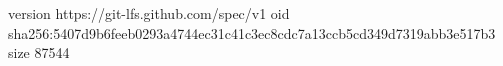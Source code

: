 version https://git-lfs.github.com/spec/v1
oid sha256:5407d9b6feeb0293a4744ec31c41c3ec8cdc7a13ccb5cd349d7319abb3e517b3
size 87544
